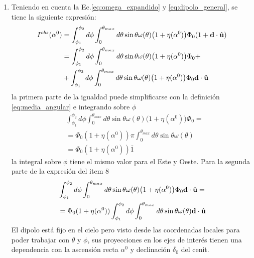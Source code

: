 \begin{enumerate}
    \item Teniendo en cuenta la Ec.\ref{eq:omega_expandido} y \ref{eq:dipolo_general}, se tiene la siguiente expresión:
    \begin{align*}
        I^{obs}(\alpha^0) &= \int_{\phi_1}^{\phi_2} d\phi \int_{0}^{\theta_{max}} d\theta  \sin\theta \omega(\theta)\big(1 + \eta(\alpha^0) \big) \Phi_0 ( 1 +  \textbf{d}\cdot\hat{\bf{u}})\\
        &= \int_{\phi_1}^{\phi_2} d\phi \int_{0}^{\theta_{max}} d\theta \sin\theta \omega(\theta)\big(1 + \eta(\alpha^0) \big) \Phi_0 +\\
        &+\int_{\phi_1}^{\phi_2} d\phi \int_{0}^{\theta_{max}} d\theta \sin\theta \omega(\theta)\big(1 + \eta(\alpha^0) \big) \Phi_0 \textbf{d}\cdot\hat{\bf{u}}
    \end{align*}
    \noindent la primera parte  de la igualdad  puede simplificarse con la definición \ref{eq:media_angular} e integrando sobre $\phi$
    \begin{align*}
        &\int_{\phi_1}^{\phi_2} d\phi \int_{0}^{\theta_{max}} d\theta \sin\theta \omega(\theta)\big(1 + \eta(\alpha^0) \big) \Phi_0 =\\
        &= \Phi_0 (1+ \eta(\alpha^0)) \pi \int_{0}^{\theta_{max}}  d\theta \sin\theta \omega(\theta)\\
        &= \Phi_0 (1+ \eta(\alpha^0)) \overline{1} 
    \end{align*}
    \noindent la integral sobre $\phi$ tiene el mismo valor para el Este y Oeste. Para la segunda parte de la expresión del item 8
    \begin{align}
        &\int_{\phi_1}^{\phi_2} d\phi \int_{0}^{\theta_{max}} d\theta \sin\theta \omega(\theta)\big(1 + \eta(\alpha^0) \big) \Phi_0 \textbf{d}\cdot\hat{\bf{u}}=\\
        &=\Phi_0 (1+ \eta(\alpha^0))\int_{\phi_1}^{\phi_2} d\phi \int_{0}^{\theta_{max}}  d\theta \sin\theta \omega(\theta)\textbf{d}\cdot\hat{\bf{u}} \label{segundo_term}
    \end{align}
    \noindent El dipolo está fijo en el cielo pero visto desde las coordenadas locales para poder trabajar con $\theta$ y $\phi$, sus proyecciones en los ejes de interés tienen una dependencia con la ascensión recta  $\alpha^0$ y declinación $\delta_0$ del cenit. %

\end{enumerate}
